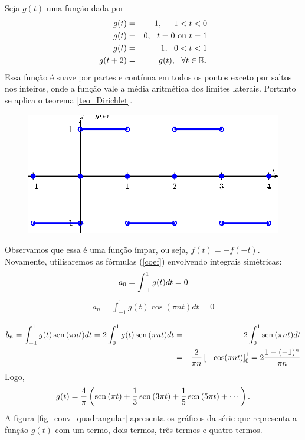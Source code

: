 \begin{ex}\label{ex_quadrada} Seja $g(t)$ uma função dada por
\begin{eqnarray*}
g(t)&=&-1, \ \ -1< t<0\\
g(t)&=&0, \ \ t=0\ \hbox{ou}\ t=1\\
g(t)&=&1, \ \ 0< t<1\\
g(t+2)&=&g(t),\ \ \forall t\in\mathbb{R}.
\end{eqnarray*}
Essa função é suave por partes e contínua em todos os pontos exceto por saltos nos inteiros, onde a função vale a média aritmética dos limites laterais. Portanto se aplica o teorema \ref{teo_Dirichlet}.
\begin{figure}[!ht]
\begin{center}

\includegraphics{cap_series/pics/figura_3}\end{center}
\end{figure}
Observamos que essa é uma função ímpar, ou seja, $f(t)=-f(-t)$. Novamente, utilisaremos as fórmulas (\ref{coef}) envolvendo integrais simétricas:
  \begin{equation*}
   a_0= \int_{-1}^{1} g(t) dt=0\\
	\end{equation*}
	\begin{eqnarray*}
   a_n=  \int_{-1}^{1} g(t)\cos(\pi n t)dt=0\\
	 \end{eqnarray*}
	\begin{eqnarray*}
   b_n=\int_{-1}^{1} g(t)\operatorname{sen}\,(\pi n t)dt=2\int_{0}^{1} g(t)\operatorname{sen}\,(\pi n t)dt&=&2\int_{0}^{1} \operatorname{sen}\,(\pi n t)dt\\
	&=&\frac{2}{\pi n}\left[-\cos(\pi n t)\right]_0^1=2\frac{1-(-1)^n}{\pi n}
  \end{eqnarray*}
Logo,
\begin{equation}
g(t)=\frac{4}{\pi}\left(\operatorname{sen}\,(\pi t)+\frac{1}{3}\operatorname{sen}\,(3\pi t)+\frac{1}{5}\operatorname{sen}\,(5\pi t)+\cdots\right).
\end{equation}
A figura \ref{fig_conv_quadrangular} apresenta os gráficos da série que representa a função $g(t)$ com um termo, dois termos, três termos e quatro termos.
\begin{figure}[!ht]
\begin{center}


\end{center}
\end{figure}
\end{ex}
